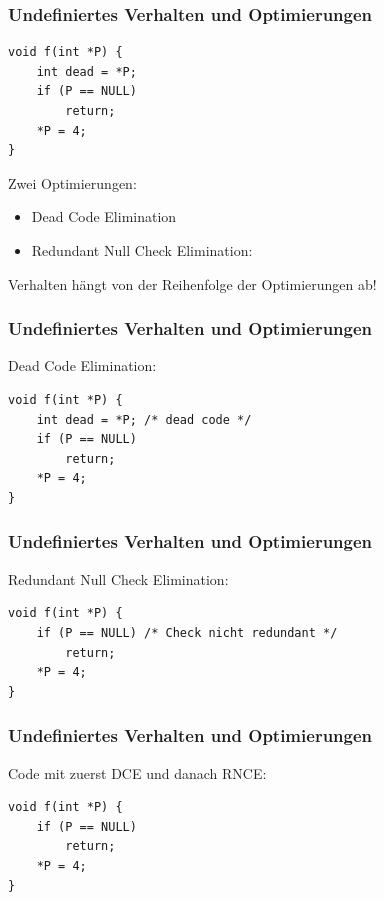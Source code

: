 \documentclass[12pt,compress]{beamer}
\begin{document}
\begin{frame}[fragile]
\frametitle{Undefiniertes Verhalten und Optimierungen}

\begin{lstlisting}
void f(int *P) {
    int dead = *P;
    if (P == NULL)
        return;
    *P = 4;
}
\end{lstlisting}

\vfill
Zwei Optimierungen:
\begin{itemize}
\item Dead Code Elimination
\item Redundant Null Check Elimination:
\end{itemize}

\vfill

Verhalten hängt von der Reihenfolge der Optimierungen ab!
\end{frame}


\begin{frame}[fragile]
\frametitle{Undefiniertes Verhalten und Optimierungen}

Dead Code Elimination:

\vfill

\begin{lstlisting}
void f(int *P) {
    int dead = *P; /* dead code */
    if (P == NULL)
        return;
    *P = 4;
}
\end{lstlisting}
\end{frame}


\begin{frame}[fragile]
\frametitle{Undefiniertes Verhalten und Optimierungen}

Redundant Null Check Elimination:

\vfill

\begin{lstlisting}
void f(int *P) {
    if (P == NULL) /* Check nicht redundant */
        return;
    *P = 4;
}
\end{lstlisting}
\end{frame}


\begin{frame}[fragile]
\frametitle{Undefiniertes Verhalten und Optimierungen}

Code mit zuerst DCE und danach RNCE:

\vfill

\begin{lstlisting}
void f(int *P) {
    if (P == NULL)
        return;
    *P = 4;
}
\end{lstlisting}
\end{frame}
\end{document}
